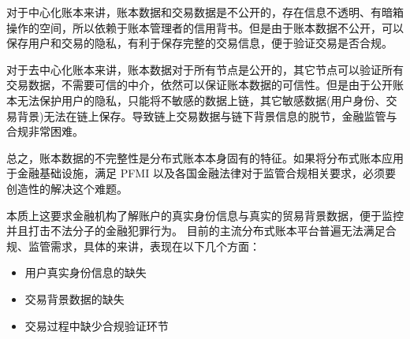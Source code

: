 对于中心化账本来讲，账本数据和交易数据是不公开的，存在信息不透明、有暗箱操作的空间，所以依赖于账本管理者的信用背书。但是由于账本数据不公开，可以保存用户和交易的隐私，有利于保存完整的交易信息，便于验证交易是否合规。

对于去中心化账本来讲，账本数据对于所有节点是公开的，其它节点可以验证所有交易数据，不需要可信的中介，依然可以保证账本数据的可信性。但是由于公开账本无法保护用户的隐私，只能将不敏感的数据上链，其它敏感数据(用户身份、交易背景)无法在链上保存。导致链上交易数据与链下背景信息的脱节，金融监管与合规非常困难。

总之，账本数据的不完整性是分布式账本本身固有的特征。如果将分布式账本应用于金融基础设施，满足 PFMI 以及各国金融法律对于监管合规相关要求，必须要创造性的解决这个难题。


本质上这要求金融机构了解账户的真实身份信息与真实的贸易背景数据，便于监控并且打击不法分子的金融犯罪行为。
目前的主流分布式账本平台普遍无法满足合规、监管需求，具体的来讲，表现在以下几个方面：

\begin{itemize}
    \item 用户真实身份信息的缺失
    \item 交易背景数据的缺失
    \item 交易过程中缺少合规验证环节
\end{itemize}
